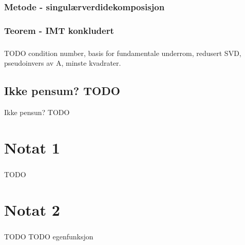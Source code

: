 \documentclass{article}
\begin{document}
      \subsubsection{Metode - singulærverdidekomposisjon}
        
      \subsubsection{Teorem - IMT konkludert}
        
      \subsubsection{}
        TODO condition number, basis for fundamentale underrom,
             redusert SVD, pseudoinvers av A, minste kvadrater.
    \subsection{Ikke pensum? TODO}
      Ikke pensun? TODO
  \section{Notat 1}
    \subsubsection{}
      TODO
  \section{Notat 2}
    \subsubsection{}
      TODO
  TODO egenfunksjon
\end{document}
